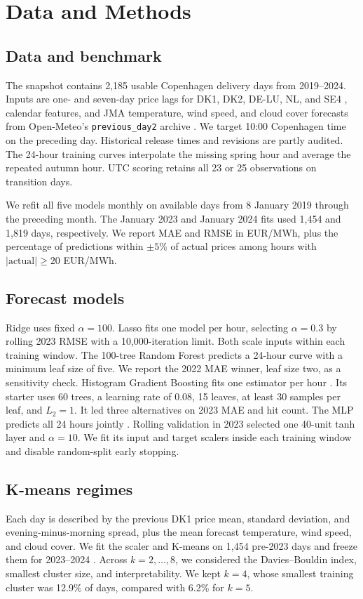 \section{Data and Methods}
\subsection{Data and benchmark}
The snapshot contains 2,185 usable Copenhagen delivery days from
2019--2024. Inputs are one- and seven-day price lags for DK1, DK2,
DE-LU, NL, and SE4 \cite{energinet,energycharts}, calendar features, and
JMA temperature, wind speed, and cloud cover forecasts from Open-Meteo's
\texttt{previous\_day2} archive \cite{openmeteo}. We target 10:00
Copenhagen time on the preceding day. Historical release times and
revisions are partly audited. The 24-hour training curves interpolate
the missing spring hour and average the repeated autumn hour. UTC
scoring retains all 23 or 25 observations on transition days.

We refit all five models monthly on available days from 8 January 2019
through the preceding month. The January 2023 and January 2024 fits
used 1,454 and 1,819 days, respectively. We report MAE and RMSE in
EUR/MWh, plus the percentage of predictions within
\(\pm5\%\) of actual prices among hours with \(|\mathrm{actual}|\geq20\)
EUR/MWh.

\subsection{Forecast models}
Ridge uses fixed \(\alpha=100\). Lasso fits one model per hour,
selecting \(\alpha=0.3\) by rolling 2023 RMSE with a 10,000-iteration
limit. Both scale inputs within each training window. The 100-tree
Random Forest predicts a 24-hour curve with a minimum leaf size of
five. We report the 2022 MAE winner, leaf size two, as a sensitivity
check. Histogram Gradient Boosting fits one estimator per hour
\cite{friedman2001,pedregosa2011}. Its starter uses 60 trees, a
learning rate of 0.08, 15 leaves, at least 30 samples per leaf, and
\(L_2=1\). It led three alternatives on 2023 MAE and hit count.
The MLP predicts all 24 hours jointly \cite{lago2021,goodfellow2016}.
Rolling validation in 2023 selected one 40-unit tanh layer and
\(\alpha=10\). We fit its input and target scalers inside each
training window and disable random-split early stopping.

\subsection{K-means regimes}
Each day is described by the previous DK1 price mean, standard deviation,
and evening-minus-morning spread, plus the mean forecast temperature,
wind speed, and cloud cover. We fit the scaler and K-means on 1,454
pre-2023 days and freeze them for 2023--2024 \cite{clustering}.
Across \(k=2,\ldots,8\), we considered the
Davies--Bouldin index, smallest cluster size, and interpretability.
We kept \(k=4\), whose smallest training cluster was 12.9\% of days,
compared with 6.2\% for \(k=5\).

